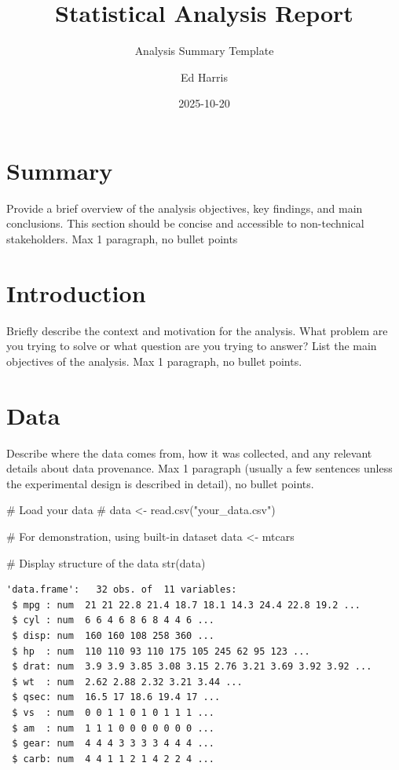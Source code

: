 \documentclass[
  letterpaper,
  DIV=11,
  numbers=noendperiod]{scrartcl}
\title{Statistical Analysis Report}
\subtitle{Analysis Summary Template}
\author{Ed Harris}
\date{2025-10-20}
\newenvironment{Shaded}{\begin{snugshade}}{\end{snugshade}}
\newcommand{\CommentTok}[1]{\textcolor[rgb]{0.37,0.37,0.37}{#1}}
\newcommand{\FunctionTok}[1]{\textcolor[rgb]{0.28,0.35,0.67}{#1}}
\newcommand{\NormalTok}[1]{\textcolor[rgb]{0.00,0.23,0.31}{#1}}
\newcommand{\OtherTok}[1]{\textcolor[rgb]{0.00,0.23,0.31}{#1}}
\renewcommand*\contentsname{Table of contents}
\newcommand\contentsname{Table of contents}
\begin{document}
\maketitle

\renewcommand*\contentsname{Table of contents}
{
\hypersetup{linkcolor=}
\setcounter{tocdepth}{3}
\tableofcontents
}

\section{Summary}\label{summary}

Provide a brief overview of the analysis objectives, key findings, and
main conclusions. This section should be concise and accessible to
non-technical stakeholders. Max 1 paragraph, no bullet points

\section{Introduction}\label{introduction}

Briefly describe the context and motivation for the analysis. What
problem are you trying to solve or what question are you trying to
answer? List the main objectives of the analysis. Max 1 paragraph, no
bullet points.

\section{Data}\label{data}

Describe where the data comes from, how it was collected, and any
relevant details about data provenance. Max 1 paragraph (usually a few
sentences unless the experimental design is described in detail), no
bullet points.

\begin{Shaded}
\begin{Highlighting}[]
\CommentTok{\# Load your data}
\CommentTok{\# data \textless{}{-} read.csv("your\_data.csv")}

\CommentTok{\# For demonstration, using built{-}in dataset}
\NormalTok{data }\OtherTok{\textless{}{-}}\NormalTok{ mtcars}

\CommentTok{\# Display structure of the data}
\FunctionTok{str}\NormalTok{(data)}
\end{Highlighting}
\end{Shaded}

\begin{verbatim}
'data.frame':   32 obs. of  11 variables:
 $ mpg : num  21 21 22.8 21.4 18.7 18.1 14.3 24.4 22.8 19.2 ...
 $ cyl : num  6 6 4 6 8 6 8 4 4 6 ...
 $ disp: num  160 160 108 258 360 ...
 $ hp  : num  110 110 93 110 175 105 245 62 95 123 ...
 $ drat: num  3.9 3.9 3.85 3.08 3.15 2.76 3.21 3.69 3.92 3.92 ...
 $ wt  : num  2.62 2.88 2.32 3.21 3.44 ...
 $ qsec: num  16.5 17 18.6 19.4 17 ...
 $ vs  : num  0 0 1 1 0 1 0 1 1 1 ...
 $ am  : num  1 1 1 0 0 0 0 0 0 0 ...
 $ gear: num  4 4 4 3 3 3 3 4 4 4 ...
 $ carb: num  4 4 1 1 2 1 4 2 2 4 ...
\end{verbatim}
\end{document}
